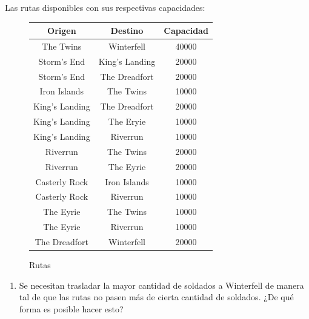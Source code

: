 \documentclass[a4paper,10pt,twocolumn]{article}
\theoremstyle{theorem}
\theoremstyle{definition}
\theoremstyle{remark}
\begin{document}
Las rutas disponibles con sus respectivas capacidades:

\begin{figure}[h!]%
	\begin{center}
		\begin{tabular}{|c|c|c|} \hline
		Origen 			 & Destino 			& Capacidad  \\ \hline
		The Twins		 & Winterfell		& 40000 		 \\ \hline
		Storm's End		 & King's Landing	& 20000 		 \\ \hline
		Storm's End		 & The Dreadfort	& 20000 		 \\ \hline
		Iron Islands	 & The Twins		& 10000 		 \\ \hline
		King's Landing	 & The Dreadfort	& 20000 		 \\ \hline
		King's Landing	 & The Eryie		& 10000 		 \\ \hline
		King's Landing	 & Riverrun			& 10000 		 \\ \hline
		Riverrun		 & The Twins		& 20000 		 \\ \hline
		Riverrun		 & The Eyrie		& 20000 		 \\ \hline
		Casterly Rock	 & Iron Islands		& 10000 		 \\ \hline
		Casterly Rock	 & Riverrun			& 10000 		 \\ \hline
		The Eyrie		 & The Twins		& 10000 		 \\ \hline
		The Eyrie		 & Riverrun			& 10000 		 \\ \hline
		The Dreadfort	 & Winterfell		& 20000 		 \\ \hline
		\end{tabular}
	\caption{Rutas}\label{fig:ejer_6_2}
	\end{center}
\end{figure}

\renewcommand{\theenumi}{\alph{enumi}} %

\begin{enumerate}

	\item Se necesitan trasladar la mayor cantidad de soldados a Winterfell de manera tal de que las rutas no pasen más de cierta cantidad de soldados. ¿De qué forma es posible hacer esto?


\end{enumerate}

\end{document}
